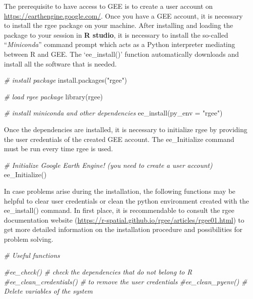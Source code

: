 \documentclass[
  10pt,
  b5paper,
  oneside]{book}
\newenvironment{Shaded}{\begin{snugshade}}{\end{snugshade}}
\newcommand{\AttributeTok}[1]{\textcolor[rgb]{0.77,0.63,0.00}{#1}}
\newcommand{\CommentTok}[1]{\textcolor[rgb]{0.56,0.35,0.01}{\textit{#1}}}
\newcommand{\FunctionTok}[1]{\textcolor[rgb]{0.00,0.00,0.00}{#1}}
\newcommand{\NormalTok}[1]{#1}
\newcommand{\StringTok}[1]{\textcolor[rgb]{0.31,0.60,0.02}{#1}}
\begin{document}
The prerequisite to have access to GEE is to create a user account on \url{https://earthengine.google.com/}. Once you have a GEE account, it is necessary to install the rgee package on your machine. After installing and loading the package to your session in \textbf{R studio}, it is necessary to install the so-called ``\emph{Miniconda}'' command prompt which acts as a Python interpreter mediating between R and GEE. The `ee\_install()' function automatically downloads and install all the software that is needed.

\begin{Shaded}
\begin{Highlighting}[]
\CommentTok{\# install package}
\FunctionTok{install.packages}\NormalTok{(}\StringTok{"rgee"}\NormalTok{)}

\CommentTok{\# load rgee package}
\FunctionTok{library}\NormalTok{(rgee)}

\CommentTok{\# install miniconda and other dependencies}
\FunctionTok{ee\_install}\NormalTok{(}\AttributeTok{py\_env =} \StringTok{"rgee"}\NormalTok{) }
\end{Highlighting}
\end{Shaded}

Once the dependencies are installed, it is necessary to initialize rgee by providing the user credentials of the created GEE account. The ee\_Initialize command must be run every time rgee is used.

\begin{Shaded}
\begin{Highlighting}[]
\CommentTok{\# Initialize Google Earth Engine! (you need to create a user account)}
\FunctionTok{ee\_Initialize}\NormalTok{()}
\end{Highlighting}
\end{Shaded}

In case problems arise during the installation, the following functions may be helpful to clear user credentials or clean the python environment created with the ee\_install() command. In first place, it is recommendable to consult the rgee documentation website (\url{https://r-spatial.github.io/rgee/articles/rgee01.html}) to get more detailed information on the installation procedure and possibilities for problem solving.

\begin{Shaded}
\begin{Highlighting}[]
\CommentTok{\# Useful functions}

\CommentTok{\#ee\_check() \# check the dependencies that do not belong to R}
\CommentTok{\#ee\_clean\_credentials() \# to remove the user credentials}
\CommentTok{\#ee\_clean\_pyenv() \# Delete variables of the system}
\end{Highlighting}
\end{Shaded}
\end{document}
